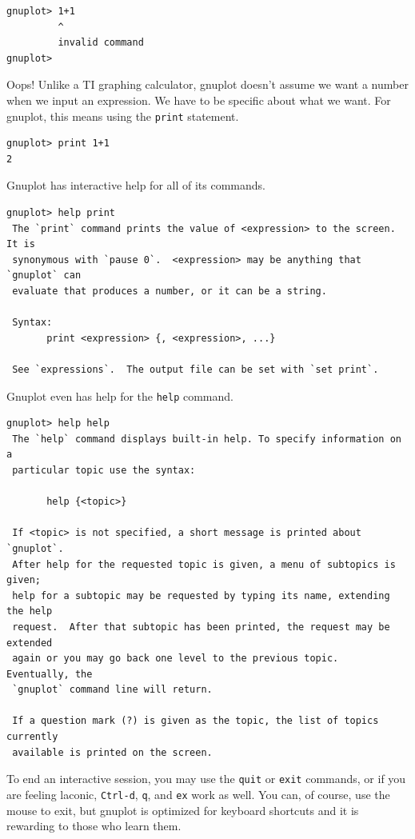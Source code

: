 \documentclass[11pt,letterpaper]{report}
\begin{document}
\begin{lstlisting}
gnuplot> 1+1
         ^
         invalid command
gnuplot> 
\end{lstlisting}

Oops! Unlike a TI graphing calculator, gnuplot doesn't assume we want a number when we input an expression. We have to be specific about what we want.
For gnuplot, this means using the \lstinline+print+ statement.

\begin{lstlisting}
gnuplot> print 1+1
2
\end{lstlisting}

Gnuplot has interactive help for all of its commands.

\begin{verbatim}
gnuplot> help print
 The `print` command prints the value of <expression> to the screen.  It is
 synonymous with `pause 0`.  <expression> may be anything that `gnuplot` can
 evaluate that produces a number, or it can be a string.

 Syntax:
       print <expression> {, <expression>, ...}

 See `expressions`.  The output file can be set with `set print`.
\end{verbatim}

Gnuplot even has help for the \lstinline+help+ command.

\begin{verbatim}
gnuplot> help help
 The `help` command displays built-in help. To specify information on a
 particular topic use the syntax:

       help {<topic>}

 If <topic> is not specified, a short message is printed about `gnuplot`.
 After help for the requested topic is given, a menu of subtopics is given;
 help for a subtopic may be requested by typing its name, extending the help
 request.  After that subtopic has been printed, the request may be extended
 again or you may go back one level to the previous topic.  Eventually, the
 `gnuplot` command line will return.

 If a question mark (?) is given as the topic, the list of topics currently
 available is printed on the screen.

\end{verbatim}

To end an interactive session, you may use the \lstinline+quit+ or \lstinline+exit+ commands, or if you are feeling laconic, \lstinline+Ctrl-d+, \lstinline+q+, and \lstinline+ex+ work as well. You can, of course, use the mouse to exit, but gnuplot is optimized for keyboard shortcuts and it is rewarding to those who learn them.
\end{document}
